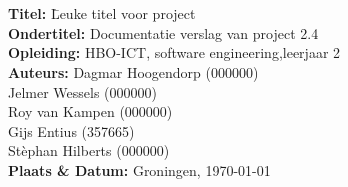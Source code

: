 \documentclass[11pt,fleqn,oneside,openany]{book} %
\newcommand{\titleText}{Leuke titel voor project} %
\newcommand{\subtitleText}{Documentatie verslag van project 2.4} %
\newcommand{\authorText}{Dagmar Hoogendorp \\ Jelmer Wessels \\ Stèphan Hilbers \\ Roy van Kampen \\ Gijs Entius \\}
\begin{document}

\begingroup
\thispagestyle{empty}
\noindent{}\\
\vfill
\endgroup


\newpage
\thispagestyle{empty}

\noindent{}\\

\begin{tabbing}
    \textbf{Titel:} \hspace{2cm} \= \titleText \\
    \textbf{Ondertitel:} \> \subtitleText \\
    \textbf{Opleiding:} \> HBO-ICT, software engineering,leerjaar 2 \\
    \textbf{Auteurs:} \> Dagmar Hoogendorp (000000) \\
    \> Jelmer Wessels (000000) \\
    \> Roy van Kampen (000000) \\
    \> Gijs Entius (357665) \\
    \> Stèphan Hilberts (000000) \\
    \textbf{Plaats \& Datum:} \> Groningen, \today 
\end{tabbing}

\end{document}
